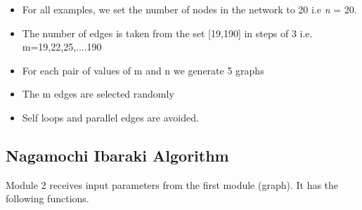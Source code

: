 \documentclass[12pt,letterpaper,titlepage,en-US]{article}
\begin{document}
\begin{itemize}
\item For all examples, we set the number of nodes in the network to 20 i.e \textit{n} = 20.

\item The number of edges is taken from the set [19,190] in steps of 3 i.e. m=19,22,25,....190

\item For each pair of values of m and n we generate 5 graphs

\item  The m edges are selected randomly 
\item Self loops and parallel edges are avoided.



\end{itemize}




\subsection{Nagamochi Ibaraki Algorithm}
Module 2 receives input parameters from the first module (graph). It has the following functions.
\end{document}
